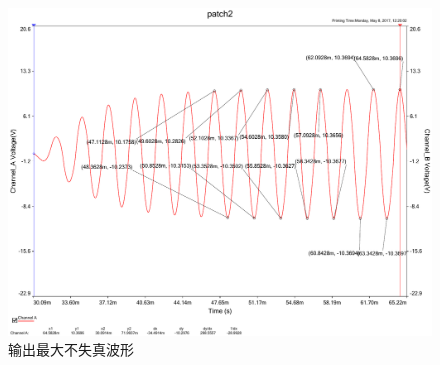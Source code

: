 \documentclass[UTF8,a4paper]{paper}
\begin{document}
\begin{figure}
\centering
\includegraphics[width=\textwidth]{maxac.pdf}
\caption{输出最大不失真波形}
\label{ACmax}
\end{figure}
\clearpage
\end{document}

